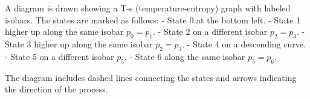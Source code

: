 A diagram is drawn showing a T-s (temperature-entropy) graph with labeled isobars. The states are marked as follows:  
- State 0 at the bottom left.  
- State 1 higher up along the same isobar \( p_0 = p_1 \).  
- State 2 on a different isobar \( p_2 = p_3 \).  
- State 3 higher up along the same isobar \( p_2 = p_3 \).  
- State 4 on a descending curve.  
- State 5 on a different isobar \( p_5 \).  
- State 6 along the same isobar \( p_5 = p_6 \).  

The diagram includes dashed lines connecting the states and arrows indicating the direction of the process.